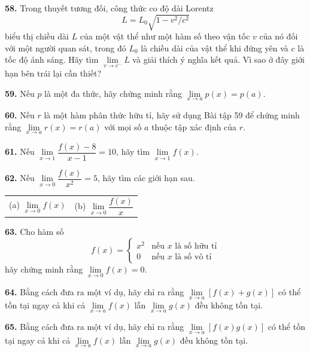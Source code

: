 \begin{minipage}[t]{0.485\textwidth}
\setlength{\parindent}{0pt}

\textbf{58.} Trong thuyết tương đối, công thức co độ dài Lorentz
\[
L = L_0 \sqrt{1 - v^2/c^2}
\]
biểu thị chiều dài $L$ của một vật thể như một hàm số theo vận tốc $v$ của nó đối với một người quan sát, trong đó $L_0$ là chiều dài của vật thể khi đứng yên và $c$ là tốc độ ánh sáng. Hãy tìm $\lim\limits_{v \to c^-} L$ và giải thích ý nghĩa kết quả. Vì sao ở đây giới hạn bên trái lại cần thiết?

\vspace{5pt}
\textbf{59.} Nếu $p$ là một đa thức, hãy chứng minh rằng $\lim\limits_{x \to a} p(x) = p(a)$.

\vspace{5pt}
\textbf{60.} Nếu $r$ là một hàm phân thức hữu tỉ, hãy sử dụng Bài tập 59 để chứng minh rằng $\lim\limits_{x \to a} r(x) = r(a)$ với mọi số $a$ thuộc tập xác định của $r$.

\vspace{5pt}
\textbf{61.} Nếu $\lim\limits_{x \to 1} \dfrac{f(x) - 8}{x - 1} = 10$, hãy tìm $\lim\limits_{x \to 1} f(x)$.

\vspace{5pt}
\textbf{62.} Nếu $\lim\limits_{x \to 0} \dfrac{f(x)}{x^2} = 5$, hãy tìm các giới hạn sau.
\vspace{1pt}

\begin{tabularx}{\linewidth}{@{}XX@{}}
(a) $\lim\limits_{x \to 0} f(x)$ & (b) $\lim\limits_{x \to 0} \dfrac{f(x)}{x}$
\end{tabularx}

\vspace{5pt}
\textbf{63.} Cho hàm số
\[
f(x) = \begin{cases}
x^2 & \text{nếu } x \text{ là số hữu tỉ} \\
0 & \text{nếu } x \text{ là số vô tỉ}
\end{cases}
\]
hãy chứng minh rằng $\lim\limits_{x \to 0} f(x) = 0$.

\vspace{5pt}
\textbf{64.} Bằng cách đưa ra một ví dụ, hãy chỉ ra rằng $\lim\limits_{x \to a} [f(x) + g(x)]$ có thể tồn tại ngay cả khi cả $\lim\limits_{x \to a} f(x)$ lẫn $\lim\limits_{x \to a} g(x)$ đều không tồn tại.

\vspace{5pt}
\textbf{65.} Bằng cách đưa ra một ví dụ, hãy chỉ ra rằng $\lim\limits_{x \to a} [f(x)g(x)]$ có thể tồn tại ngay cả khi cả $\lim\limits_{x \to a} f(x)$ lẫn $\lim\limits_{x \to a} g(x)$ đều không tồn tại.


\end{minipage}
